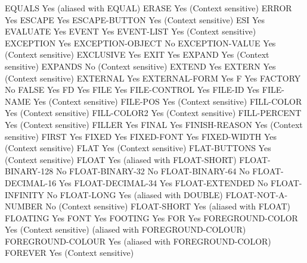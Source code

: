 EQUALS                          Yes (aliased with EQUAL)
ERASE                           Yes (Context sensitive)
ERROR                           Yes
ESCAPE                          Yes
ESCAPE-BUTTON                   Yes (Context sensitive)
ESI                             Yes
EVALUATE                        Yes
EVENT                           Yes
EVENT-LIST                      Yes (Context sensitive)
EXCEPTION                       Yes
EXCEPTION-OBJECT                No
EXCEPTION-VALUE                 Yes (Context sensitive)
EXCLUSIVE                       Yes
EXIT                            Yes
EXPAND                          Yes (Context sensitive)
EXPANDS                         No (Context sensitive)
EXTEND                          Yes
EXTERN                          Yes (Context sensitive)
EXTERNAL                        Yes
EXTERNAL-FORM                   Yes
F                               Yes
FACTORY                         No
FALSE                           Yes
FD                              Yes
FILE                            Yes
FILE-CONTROL                    Yes
FILE-ID                         Yes
FILE-NAME                       Yes (Context sensitive)
FILE-POS                        Yes (Context sensitive)
FILL-COLOR                      Yes (Context sensitive)
FILL-COLOR2                     Yes (Context sensitive)
FILL-PERCENT                    Yes (Context sensitive)
FILLER                          Yes
FINAL                           Yes
FINISH-REASON                   Yes (Context sensitive)
FIRST                           Yes
FIXED                           Yes
FIXED-FONT                      Yes
FIXED-WIDTH                     Yes (Context sensitive)
FLAT                            Yes (Context sensitive)
FLAT-BUTTONS                    Yes (Context sensitive)
FLOAT                           Yes (aliased with FLOAT-SHORT)
FLOAT-BINARY-128                No
FLOAT-BINARY-32                 No
FLOAT-BINARY-64                 No
FLOAT-DECIMAL-16                Yes
FLOAT-DECIMAL-34                Yes
FLOAT-EXTENDED                  No
FLOAT-INFINITY                  No
FLOAT-LONG                      Yes (aliased with DOUBLE)
FLOAT-NOT-A-NUMBER              No (Context sensitive)
FLOAT-SHORT                     Yes (aliased with FLOAT)
FLOATING                        Yes
FONT                            Yes
FOOTING                         Yes
FOR                             Yes
FOREGROUND-COLOR                Yes (Context sensitive) (aliased with FOREGROUND-COLOUR)
FOREGROUND-COLOUR               Yes (aliased with FOREGROUND-COLOR)
FOREVER                         Yes (Context sensitive)
